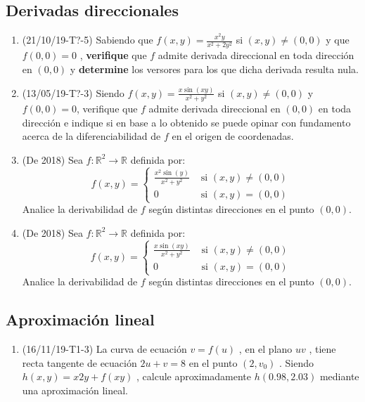 \documentclass[12pt,a4paper]{article}
\renewcommand{\b}[1]{\textbf{#1}}
\newcommand{\R}{\mathbb{R}}
\begin{document}
\subsection{Derivadas direccionales}
\begin{enumerate}
	\item (21/10/19-T?-5) Sabiendo que $ f ( x , y ) = \frac{x^2y}{x^2+2y^2} $ si $ ( x , y )\neq ( 0 , 0 ) $ y que $ f ( 0 , 0 ) = 0 $ , \b{verifique} que $ f $ admite derivada direccional en toda dirección en $ ( 0 , 0 ) $ y \b{determine} los versores para los que dicha derivada resulta nula.
	
	\item (13/05/19-T?-3) Siendo $ f ( x , y ) =	\frac{x \sin( x y )}{x^2 + y^2} $ si $ ( x , y ) \neq ( 0 , 0 ) $ y $ f ( 0 , 0 ) = 0 $, verifique que $ f $ admite derivada direccional en $ ( 0 , 0 ) $ en toda dirección e indique si en base a lo obtenido se puede opinar con fundamento	acerca de la diferenciabilidad de $ f $ en el origen de coordenadas.
	
	\item (De 2018) Sea $ f : \R^2\rightarrow\R $ definida por:
	\[f(x, y) = \begin{cases}
		\frac{x^2\sin(y)}{x^2 + y^2} & \text{ si }(x, y)\neq(0, 0)\\
		0 & \text{ si }(x, y)=(0, 0)
	\end{cases}
	\]
	Analice la derivabilidad de $ f $ según distintas direcciones en el punto $(0, 0)$.
	
	\item (De 2018) Sea $ f : \R^2\rightarrow\R $ definida por:
	\[f(x, y) = \begin{cases}
	\frac{x\sin(xy)}{x^2 + y^2} & \text{ si }(x, y)\neq(0, 0)\\
	0 & \text{ si }(x, y)=(0, 0)
	\end{cases}
	\]
	Analice la derivabilidad de $ f $ según distintas direcciones en el punto $(0, 0)$.
\end{enumerate}

\subsection{Aproximación lineal}
\begin{enumerate}
	\item (16/11/19-T1-3) La curva de ecuación $ v = f (u ) $ , en el plano $ uv $ , tiene recta tangente de ecuación $ 2 u + v = 8 $ en el punto $ ( 2 , v_0 ) $ . Siendo $ h ( x , y ) = x 2 y + f ( x y ) $ , calcule aproximadamente $ h ( 0 . 98 , 2 . 03 ) $ mediante una aproximación lineal.
\end{enumerate}
\end{document}
